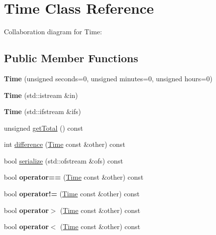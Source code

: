 \hypertarget{classTime}{}\section{Time Class Reference}
\label{classTime}


Collaboration diagram for Time\+:
\subsection*{Public Member Functions}
\begin{DoxyCompactItemize}
\item 
\mbox{\label{classTime_a393f1af1f9496b8833e3207f99325167}} 
{\bfseries Time} (unsigned seconds=0, unsigned minutes=0, unsigned hours=0)
\item 
\mbox{\label{classTime_a85ec464631df4b1284f2e0d53f549750}} 
{\bfseries Time} (std\+::istream \&in)
\item 
\mbox{\label{classTime_a9f96dc51f4ad6a98493ebc129b8f125a}} 
{\bfseries Time} (std\+::ifstream \&ifs)
\item 
unsigned \hyperlink{classTime_ac64625b85a2497986774edcc8dde50e9}{get\+Total} () const
\item 
int \hyperlink{classTime_af02e08b3bf203d9cedbf9f629cddcc1f}{difference} (\hyperlink{classTime}{Time} const \&other) const
\item 
bool \hyperlink{classTime_acab7dbc13c8a0d9a0f33047d41f4aee0}{serialize} (std\+::ofstream \&ofs) const
\item 
\mbox{\label{classTime_a682cdf808ba44f29b2e33ed257906a10}} 
bool {\bfseries operator==} (\hyperlink{classTime}{Time} const \&other) const
\item 
\mbox{\label{classTime_a04c5a1b7338a14253ab3797afe39316d}} 
bool {\bfseries operator!=} (\hyperlink{classTime}{Time} const \&other) const
\item 
\mbox{\label{classTime_a6d544b6af2fd13223a5436d34964fe3a}} 
bool {\bfseries operator$>$} (\hyperlink{classTime}{Time} const \&other) const
\item 
\mbox{\label{classTime_a334738a8a0f1f8d1e6ec15d0128ad5d3}} 
bool {\bfseries operator$<$} (\hyperlink{classTime}{Time} const \&other) const

\end{DoxyCompactItemize}
